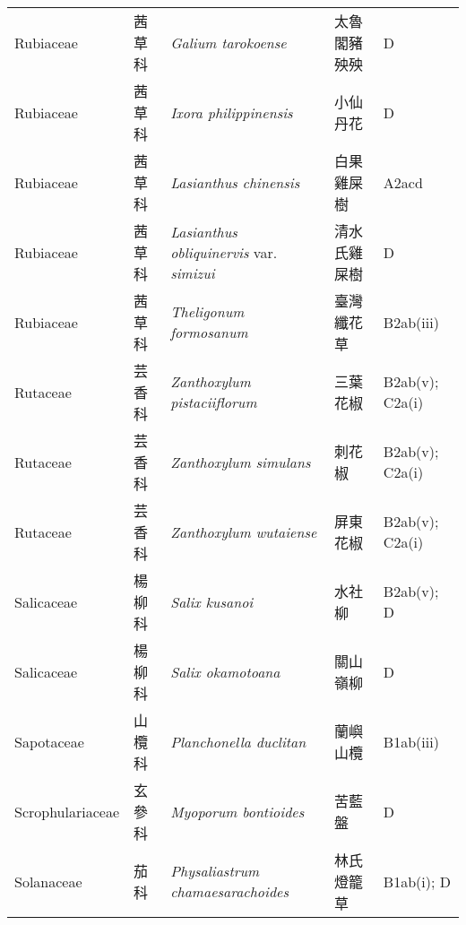 {\begin{longtable}{p{2.5cm}p{2.5cm}p{4.5cm}p{2.5cm}p{3cm}}
    Rubiaceae & 茜草科 & \textit{Galium tarokoense}  & 太魯閣豬殃殃 & D \index{Galium@\textit{Galium}!tarokoense@\textit{tarokoense}}  \index{太魯閣豬殃殃} \\
    Rubiaceae & 茜草科 & \textit{Ixora philippinensis}  & 小仙丹花 & D \index{Ixora@\textit{Ixora}!philippinensis@\textit{philippinensis}}  \index{小仙丹花} \\
    Rubiaceae & 茜草科 & \textit{Lasianthus chinensis}  & 白果雞屎樹 & A2acd \index{Lasianthus@\textit{Lasianthus}!chinensis@\textit{chinensis}}  \index{白果雞屎樹} \\
    Rubiaceae & 茜草科 & \textit{Lasianthus obliquinervis} var. \textit{simizui}  & 清水氏雞屎樹 & D \index{Lasianthus@\textit{Lasianthus}!obliquinervis@\textit{obliquinervis}!var. simizui@var. \textit{simizui}}  \index{清水氏雞屎樹} \\
    Rubiaceae & 茜草科 & \textit{Theligonum formosanum}  & 臺灣纖花草 & B2ab(iii) \index{Theligonum@\textit{Theligonum}!formosanum@\textit{formosanum}}  \index{臺灣纖花草} \\
    Rutaceae & 芸香科 & \textit{Zanthoxylum pistaciiflorum}  & 三葉花椒 & B2ab(v); C2a(i) \index{Zanthoxylum@\textit{Zanthoxylum}!pistaciiflorum@\textit{pistaciiflorum}}  \index{三葉花椒} \\
    Rutaceae & 芸香科 & \textit{Zanthoxylum simulans}  & 刺花椒 & B2ab(v); C2a(i) \index{Zanthoxylum@\textit{Zanthoxylum}!simulans@\textit{simulans}}  \index{刺花椒} \\
    Rutaceae & 芸香科 & \textit{Zanthoxylum wutaiense}  & 屏東花椒 & B2ab(v); C2a(i) \index{Zanthoxylum@\textit{Zanthoxylum}!wutaiense@\textit{wutaiense}}  \index{屏東花椒} \\
    Salicaceae & 楊柳科 & \textit{Salix kusanoi}  & 水社柳 & B2ab(v); D \index{Salix@\textit{Salix}!kusanoi@\textit{kusanoi}}  \index{水社柳} \\
    Salicaceae & 楊柳科 & \textit{Salix okamotoana}  & 關山嶺柳 & D \index{Salix@\textit{Salix}!okamotoana@\textit{okamotoana}}  \index{關山嶺柳} \\
    Sapotaceae & 山欖科 & \textit{Planchonella duclitan}  & 蘭嶼山欖 & B1ab(iii) \index{Planchonella@\textit{Planchonella}!duclitan@\textit{duclitan}}  \index{蘭嶼山欖} \\
    Scrophulariaceae & 玄參科 & \textit{Myoporum bontioides}  & 苦藍盤 & D \index{Myoporum@\textit{Myoporum}!bontioides@\textit{bontioides}}  \index{苦藍盤} \\
    Solanaceae & 茄科 & \textit{Physaliastrum chamaesarachoides}  & 林氏燈籠草 & B1ab(i); D \index{Physaliastrum@\textit{Physaliastrum}!chamaesarachoides@\textit{chamaesarachoides}}  \index{林氏燈籠草} \\

\end{longtable}}
